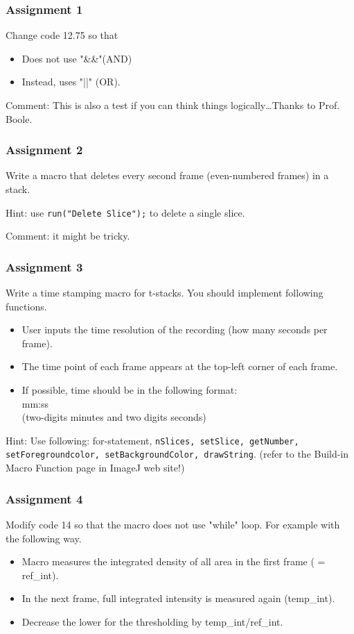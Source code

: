 \documentclass[11pt,a4paper,oneside]{report}
\newcommand{\ilcom}[1]{\texttt{\small#1}}
\begin{document}
\subsubsection{Assignment 1}
Change code 12.75 so that 
\begin{itemize}
\item Does not use "\&\&"(AND) 
\item Instead, uses "||" (OR). 
\end{itemize}

Comment: This is also a test if you can think things logically\ldots Thanks to Prof. Boole. 

\subsubsection{Assignment 2}  
Write a macro that deletes every second frame (even-numbered frames) in a stack. 

Hint: use \ilcom{run("Delete Slice");} to delete a single slice. 

Comment: it might be tricky.

\subsubsection{Assignment 3} 
Write a time stamping macro for t-stacks. You should implement following functions. 
\begin{itemize}
\item User inputs the time resolution of the recording (how many seconds per frame).
\item The time point of each frame appears at the top-left corner of each frame.  
\item If possible, time should be in the following format: \\
mm:ss \\
(two-digits minutes and two digits seconds)
\end{itemize}
Hint: Use following: for-statement, \ilcom{nSlices, setSlice, getNumber,\\ setForegroundcolor, setBackgroundColor, drawString}. (refer to the Build-in Macro Function page in ImageJ web site!)

\subsubsection{Assignment 4} 
Modify code 14 so that the macro does not use "while" loop. For example with the following way. 
\begin{itemize}
\item Macro measures the integrated density of all area in the first frame ( = ref\_int).
\item In the next frame, full integrated intensity is measured again (temp\_int).
\item Decrease the lower for the thresholding by temp\_int/ref\_int.
 \end{itemize}
\end{document}
